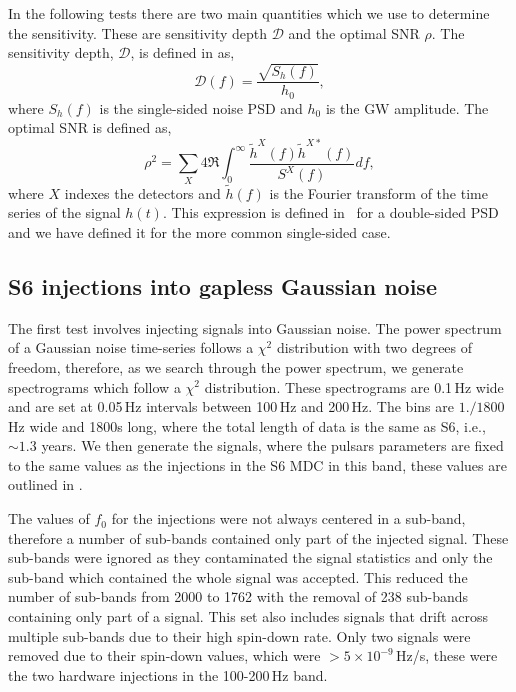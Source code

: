 In the following tests there are two main quantities which we use to determine
the sensitivity. These are sensitivity depth $\mathcal{D}$ and the optimal
\gls{SNR} $\rho$.  The sensitivity depth, $\mathcal{D}$, is defined in
\citep{behnke2015PostprocessingMethods} as,
%
\begin{equation}
\label{soap:results:sigmoid}
\mathcal{D}(f) = \frac{\sqrt{S_h(f)}}{h_0},
\end{equation}
%
where $S_h(f)$ is the single-sided noise \gls{PSD} and $h_0$ is the \gls{GW} amplitude.  The optimal \gls{SNR} is defined as,
%
\begin{equation}
\rho^2 = \sum_X 4
\Re\int^{\infty}_{0}\frac{\tilde{h}^X(f)\tilde{h}^{X*}(f)}{S^X(f)}df,
\end{equation}
%
 where $X$ indexes the
detectors and $\tilde{h}(f)$ is the Fourier transform of the time
series of the signal $h(t)$. This expression is defined in~\citep{prix2007SearchContinuous} for
a double-sided \gls{PSD} and we have defined it for the more common single-sided
case.

\subsection{\label{soap:results:gaplessgauss}S6 injections into gapless Gaussian noise}
%
%
The first test involves injecting signals into Gaussian noise. The power spectrum of a Gaussian noise time-series follows a $\chi^2$ distribution with two degrees of freedom, therefore, as we search through the power spectrum, we generate spectrograms which follow a $\chi^2$ distribution. 
These spectrograms are 0.1\,Hz wide and are set at 0.05\,Hz intervals between 100\,Hz and 200\,Hz. The bins are $1./1800$\,Hz wide and 1800s long, where the total length of data is the same as S6, i.e., $\sim 1.3$ years.
We then generate the signals, where the pulsars parameters are
fixed to the same values as the injections in the S6 \gls{MDC} in this band, 
these values are outlined in \citep{walsh2016ComparisonMethods}.

%
%
The values of $f_0$ for the injections were not always centered in a
sub-band, therefore a number of sub-bands contained only part of the injected
signal. These sub-bands were ignored as they contaminated the signal statistics
and only the sub-band which contained the whole signal was accepted.  This
reduced the number of sub-bands from 2000 to 1762 with the removal of 238
sub-bands containing only part of a signal.
This set also includes signals that
drift across multiple sub-bands due to their high spin-down
rate. Only two signals were removed due to their spin-down values, which were $> 5 \times 10^{-9}$\,Hz/s, these were the two hardware injections in the 100-200\,Hz band.

